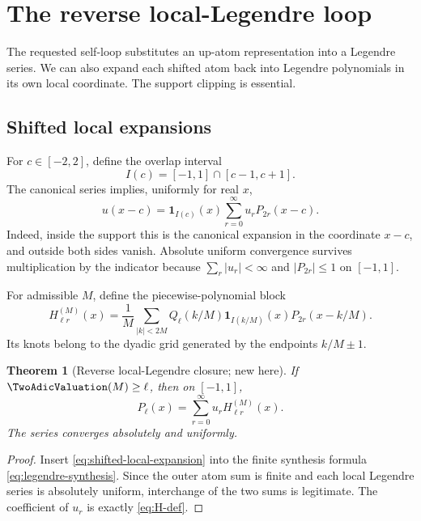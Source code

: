 \documentclass[11pt,oneside]{article}
\numberwithin{equation}{section}
\newtheorem{theorem}{Theorem}[section]
\theoremstyle{definition}
\theoremstyle{remark}
\begin{document}
\section{The reverse local-Legendre loop}
\label{sec:reverse-loop}

The requested self-loop substitutes an up-atom representation into a Legendre
series.  We can also expand each shifted atom back into Legendre polynomials in
its own local coordinate.  The support clipping is essential.

\subsection{Shifted local expansions}

For $c\in[-2,2]$, define the overlap interval
\begin{equation}
 I(c)=[-1,1]\cap[c-1,c+1].
 \label{eq:overlap-interval}
\end{equation}
The canonical series implies, uniformly for real $x$,
\begin{equation}
 u(x-c)=\mathbf1_{I(c)}(x)
 \sum_{r=0}^{\infty}u_rP_{2r}(x-c).
 \label{eq:shifted-local-expansion}
\end{equation}
Indeed, inside the support this is the canonical expansion in the coordinate
$x-c$, and outside both sides vanish.  Absolute uniform convergence survives
multiplication by the indicator because $\sum_r|u_r|<\infty$ and
$|P_{2r}|\le1$ on $[-1,1]$.

For admissible $M$, define the piecewise-polynomial block
\begin{equation}
 H_{\ell r}^{(M)}(x)=\frac1M\sum_{|k|<2M}
 Q_\ell(k/M)\mathbf1_{I(k/M)}(x)P_{2r}(x-k/M).
 \label{eq:H-def}
\end{equation}
Its knots belong to the dyadic grid generated by the endpoints
$k/M\pm1$.

\begin{theorem}[Reverse local-Legendre closure; new here]
\label{thm:reverse-loop}
If $\TwoAdicValuation(M)\ge\ell$, then on $[-1,1]$,
\begin{equation}
 \boxed{
 P_\ell(x)=\sum_{r=0}^{\infty}u_rH_{\ell r}^{(M)}(x).}
 \label{eq:reverse-loop}
\end{equation}
The series converges absolutely and uniformly.
\end{theorem}

\begin{proof}
Insert \eqref{eq:shifted-local-expansion} into the finite synthesis formula
\eqref{eq:legendre-synthesis}.  Since the outer atom sum is finite and each
local Legendre series is absolutely uniform, interchange of the two sums is
legitimate.  The coefficient of $u_r$ is exactly \eqref{eq:H-def}.
\end{proof}
\end{document}
